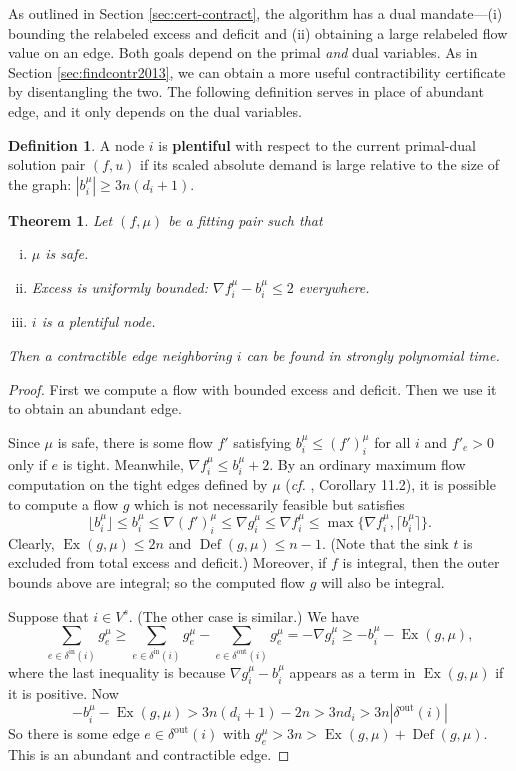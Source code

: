 \documentclass[11pt]{article}
\newtheorem{theorem}{Theorem}[section]
\theoremstyle{definition}
\newtheorem{definition}{Definition}[section]
\theoremstyle{definition}
\theoremstyle{definition}
\newcommand{\fu}{f^{\mu}}
\newcommand{\nfiu}{\nabla \fu_i}
\newcommand{\biu}{b_{i}^{\mu}}
\newcommand{\din}{\delta^{\text{in}}}
\newcommand{\dout}{\delta^{\text{out}}}
\newcommand{\vsrc}{V^{s}}
\DeclareMathOperator{\Ex}{Ex}
\DeclareMathOperator{\Def}{Def}
\begin{document}
    As outlined in Section \ref{sec:cert-contract}, the algorithm
    has a dual mandate---(i) bounding the relabeled excess and deficit and (ii)
    obtaining a large relabeled flow value on an edge. Both goals depend on the primal
    \emph{and} dual variables. As in Section \ref{sec:findcontr2013}, we can obtain
    a more useful contractibility certificate by disentangling the two. The following
    definition serves in place of abundant edge, and it only depends on the dual variables.
    \begin{definition}
    A node $i$ is \textbf{plentiful} with respect
    to the current primal-dual solution pair $(f,u)$ if its scaled absolute
    demand is large relative to the size of the graph: $|b_i^{\mu}| \ge 3n(d_i + 1)$.
    \end{definition}
	\begin{theorem} \label{thm:2017-contraction}
		Let $(f, \mu)$ be a fitting pair such that
		\begin{enumerate}[(i)]
			\item $\mu$ is safe.
			\item Excess is uniformly bounded: $\nabla f_i^\mu - \biu \leq 2$ everywhere.
			\item $i$ is a plentiful node.
		\end{enumerate}
		Then a contractible edge neighboring $i$ can be found in strongly polynomial time.
	\end{theorem}
	\begin{proof}
		First we compute a flow with bounded excess and deficit. Then we use it to obtain
		an abundant edge.
		
		Since $\mu$ is safe, there is some flow $f'$ satisfying $\biu \leq (f')_i^\mu$
		for all $i$ and $f'_e > 0$ only if $e$ is tight. Meanwhile, $\nfiu \leq \biu + 2$.
		By an ordinary maximum flow computation on the tight edges defined by $\mu$
		(\emph{cf.} \cite{Schrijver2002}, Corollary 11.2),
		it is possible to compute a flow $g$ which is not necessarily feasible but satisfies
		\[ \lfloor \biu \rfloor \leq \biu \leq \nabla (f')_i^\mu
		   \leq \nabla g_i^\mu \leq \nfiu \leq \max \{\nfiu, \lceil\biu\rceil\}. \]
		Clearly, $\Ex(g, \mu) \leq 2n$ and $\Def(g, \mu) \leq n - 1$. (Note that the
		sink $t$ is excluded from total excess and deficit.) Moreover, if $f$ is
		integral, then the outer bounds above are integral; so
		the computed flow $g$ will also be integral.
	
		Suppose that $i \in \vsrc$. (The other case is similar.) We have
		\[ \sum_{e \in \din(i)} g^\mu_e \geq
		\sum_{e \in \din(i)} g^\mu_e - \sum_{e \in \dout(i)} g^\mu_e
		= -\nabla g^\mu_i \geq -b_i^\mu - \Ex(g, \mu), \]
		where the last inequality is because $\nabla g_i^\mu - \biu$ appears
		as a term in $\Ex(g, \mu)$ if it is positive. Now
		\[ -b_i^\mu - \Ex(g, \mu) > 3n(d_i + 1) - 2n > 3nd_i > 3n|\dout(i)| \]
		So there is some edge $e \in \dout(i)$ with
		$g^\mu_e > 3n > \Ex(g, \mu) + \Def(g, \mu)$. This is an abundant and contractible
		edge.
	\end{proof}
\end{document}
